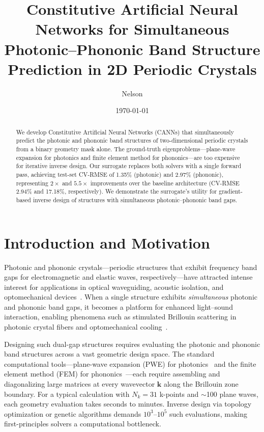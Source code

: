 \documentclass[11pt]{article}
\title{Constitutive Artificial Neural Networks for Simultaneous Photonic--Phononic Band Structure Prediction in 2D Periodic Crystals}
\author{Nelson}
\date{\today}
\begin{document}
\maketitle

\begin{abstract}
We develop Constitutive Artificial Neural Networks (CANNs) that simultaneously predict the photonic and phononic band structures of two-dimensional periodic crystals from a binary geometry mask alone. The ground-truth eigenproblems---plane-wave expansion for photonics and finite element method for phononics---are too expensive for iterative inverse design. Our surrogate replaces both solvers with a single forward pass, achieving test-set CV-RMSE of 1.35\% (photonic) and 2.97\% (phononic), representing $2\times$ and $5.5\times$ improvements over the baseline architecture (CV-RMSE 2.94\% and 17.18\%, respectively). We demonstrate the surrogate's utility for gradient-based inverse design of structures with simultaneous photonic--phononic band gaps.
\end{abstract}

\section{Introduction and Motivation}
\label{sec:intro}

Photonic and phononic crystals---periodic structures that exhibit frequency band gaps for electromagnetic and elastic waves, respectively---have attracted intense interest for applications in optical waveguiding, acoustic isolation, and optomechanical devices~\cite{joannopoulos2008,kushwaha1993}. When a single structure exhibits \emph{simultaneous} photonic and phononic band gaps, it becomes a platform for enhanced light--sound interaction, enabling phenomena such as stimulated Brillouin scattering in photonic crystal fibers and optomechanical cooling~\cite{maldovan2006,pennec2010}.

Designing such dual-gap structures requires evaluating the photonic and phononic band structures across a vast geometric design space. The standard computational tools---plane-wave expansion (PWE) for photonics~\cite{joannopoulos2008} and the finite element method (FEM) for phononics~\cite{kushwaha1993}---each require assembling and diagonalizing large matrices at every wavevector $\mathbf{k}$ along the Brillouin zone boundary. For a typical calculation with $N_k = 31$ k-points and $\sim$100 plane waves, each geometry evaluation takes seconds to minutes. Inverse design via topology optimization or genetic algorithms demands $10^3$--$10^5$ such evaluations, making first-principles solvers a computational bottleneck.
\end{document}
